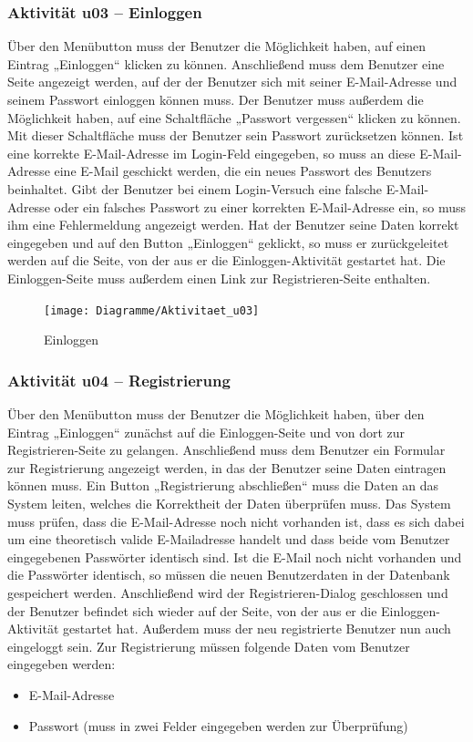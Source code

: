 \documentclass[a4paper,12pt,oneside]{scrartcl}
\begin{document}
\subsubsection{Aktivität u03 – Einloggen}
Über den Menübutton muss der Benutzer die Möglichkeit haben, auf einen Eintrag „Einloggen“ klicken zu können.
Anschließend muss dem Benutzer eine Seite angezeigt werden, auf der der Benutzer sich mit seiner E-Mail-Adresse und seinem Passwort einloggen können muss.
Der Benutzer muss außerdem die Möglichkeit haben, auf eine Schaltfläche „Passwort vergessen“ klicken zu können. Mit dieser Schaltfläche muss der Benutzer sein Passwort zurücksetzen können.
Ist eine korrekte E-Mail-Adresse im Login-Feld eingegeben, so muss an diese E-Mail-Adresse eine E-Mail geschickt werden, die ein neues Passwort des Benutzers beinhaltet.
Gibt der Benutzer bei einem Login-Versuch eine falsche E-Mail-Adresse oder ein falsches Passwort zu einer korrekten E-Mail-Adresse ein, so muss ihm eine Fehlermeldung angezeigt werden.
Hat der Benutzer seine Daten korrekt eingegeben und auf den Button „Einloggen“ geklickt, so muss er zurückgeleitet werden auf die Seite, von der aus er die Einloggen-Aktivität gestartet hat.
Die Einloggen-Seite muss außerdem einen Link zur Registrieren-Seite enthalten.

\begin{figure}[!htbp]
\centering
\noindent\texttt{[image: Diagramme/Aktivitaet\_u03]}
\caption{Einloggen}
\end{figure}
\FloatBarrier


\subsubsection{Aktivität u04 – Registrierung}
Über den Menübutton muss der Benutzer die Möglichkeit haben, über den Eintrag „Einloggen“ zunächst auf die Einloggen-Seite und von dort zur Registrieren-Seite zu gelangen.
Anschließend muss dem Benutzer ein Formular zur Registrierung angezeigt werden, in das der Benutzer seine Daten eintragen können muss.
Ein Button „Registrierung abschließen“ muss die Daten an das System leiten, welches die Korrektheit der Daten überprüfen muss.
Das System muss prüfen, dass die E-Mail-Adresse noch nicht vorhanden ist, dass es sich dabei um eine theoretisch valide E-Mailadresse handelt und dass beide vom Benutzer eingegebenen Passwörter identisch sind.
Ist die E-Mail noch nicht vorhanden und die Passwörter identisch, so müssen die neuen Benutzerdaten in der Datenbank gespeichert werden. Anschließend wird der Registrieren-Dialog geschlossen und der Benutzer befindet sich wieder auf der Seite, von der aus er die Einloggen-Aktivität gestartet hat.
Außerdem muss der neu registrierte Benutzer nun auch eingeloggt sein.
Zur Registrierung müssen folgende Daten vom Benutzer eingegeben werden:
\begin{itemize}
	\item E-Mail-Adresse
	\item Passwort (muss in zwei Felder eingegeben werden zur Überprüfung)
\end{itemize}
\end{document}
